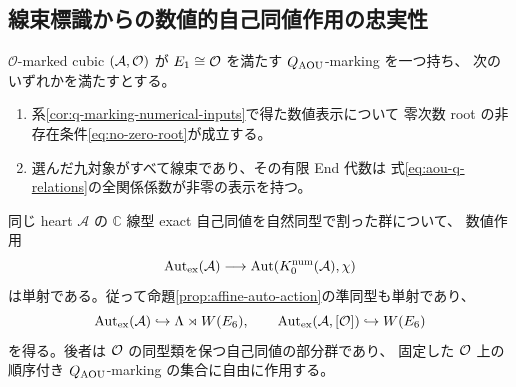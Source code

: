 \subsection{線束標識からの数値的自己同値作用の忠実性}
\begin{proposition}[標準 $Q$ 型における数値的自己同値の核]
\label{prop:q-numerical-auto-faithful}
$\mathcal O$-marked cubic $(\mathcal A,\mathcal O)$ が
$E_1\cong\mathcal O$ を満たす $Q_{\rm AOU}$-marking を一つ持ち、
次のいずれかを満たすとする。
\begin{enumerate}
\item 系\ref{cor:q-marking-numerical-inputs}で得た数値表示について
零次数 root の非存在条件\eqref{eq:no-zero-root}が成立する。
\item 選んだ九対象がすべて線束であり、その有限 End 代数は
式\eqref{eq:aou-q-relations}の全関係係数が非零の表示を持つ。
\end{enumerate}
同じ heart $\mathcal A$ の $\mathbb C$ 線型 exact 自己同値を自然同型で割った群について、
数値作用
\[
 \operatorname{Aut}_{\rm ex}(\mathcal A)
 \longrightarrow \operatorname{Aut}(K_0^{\rm num}(\mathcal A),\chi)
\]
は単射である。従って命題\ref{prop:affine-auto-action}の準同型も単射であり、
\[
 \operatorname{Aut}_{\rm ex}(\mathcal A)
 \hookrightarrow\Lambda\rtimes W(E_6),\qquad
 \operatorname{Aut}_{\rm ex}(\mathcal A,[\mathcal O])
 \hookrightarrow W(E_6)
\]
を得る。後者は $\mathcal O$ の同型類を保つ自己同値の部分群であり、
固定した $\mathcal O$ 上の順序付き $Q_{\rm AOU}$-marking の集合に自由に作用する。
\end{proposition}
